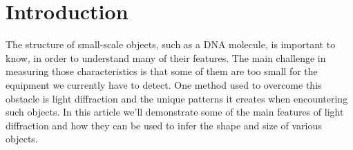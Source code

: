 \section{Introduction}
The structure of small-scale objects, such as a DNA molecule, is important to know, in order to understand many of their features.
The main challenge in measuring those characteristics is that some of them are too small for the equipment we currently have to detect.
One method used to overcome this obstacle is light diffraction and the unique patterns it creates when encountering such objects.
In this article we'll demonstrate some of the main features of light diffraction and how they can be used to infer the shape and size of various objects.
